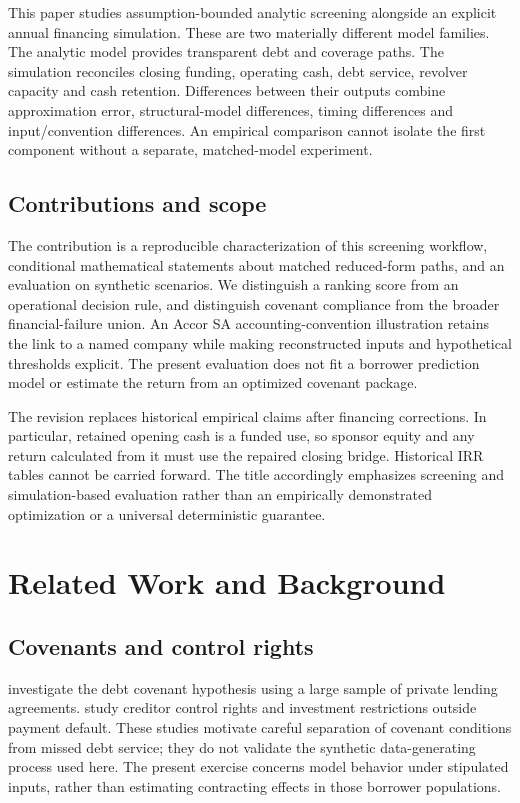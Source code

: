 \documentclass[11pt,a4paper]{article}
\theoremstyle{plain}
\theoremstyle{definition}
\begin{document}
This paper studies assumption-bounded analytic screening alongside an explicit
annual financing simulation. These are two materially different model families.
The analytic model provides transparent debt and coverage paths. The simulation
reconciles closing funding, operating cash, debt service, revolver capacity and
cash retention. Differences between their outputs combine approximation error,
structural-model differences, timing differences and input/convention differences.
An empirical comparison cannot isolate the first component without a separate,
matched-model experiment.

\subsection{Contributions and scope}
The contribution is a reproducible characterization of this screening workflow,
conditional mathematical statements about matched reduced-form paths, and an
evaluation on synthetic scenarios. We distinguish a ranking score from an
operational decision rule, and distinguish covenant compliance from the broader
financial-failure union. An Accor SA accounting-convention illustration retains
the link to a named company while making reconstructed inputs and hypothetical
thresholds explicit. The present evaluation does not fit a borrower prediction
model or estimate the return from an optimized covenant package.

The revision replaces historical empirical claims after financing corrections.
In particular, retained opening cash is a funded use, so sponsor equity and any
return calculated from it must use the repaired closing bridge. Historical IRR
tables cannot be carried forward. The title accordingly emphasizes screening and
simulation-based evaluation rather than an empirically demonstrated optimization
or a universal deterministic guarantee.

\section{Related Work and Background}
\subsection{Covenants and control rights}
\citet{dichev2002quality} investigate the debt covenant hypothesis using a large
sample of private lending agreements. \citet{nini2009creditor} study creditor
control rights and investment restrictions outside payment default. These studies
motivate careful separation of covenant conditions from missed debt service; they
do not validate the synthetic data-generating process used here. The present
exercise concerns model behavior under stipulated inputs, rather than estimating
contracting effects in those borrower populations.
\end{document}
